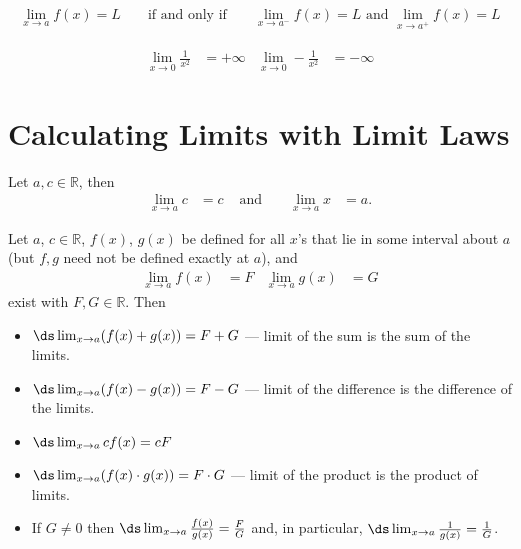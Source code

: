 \begin{theorem}
\begin{align*}
\lim_{x \to a} f(x) = L && \mbox{ if and only if } && \lim_{x \to a^-} f(x) = L \mbox{ and } \lim_{x \to a^+} f(x) = L
\end{align*}
\end{theorem}
\begin{align*}
\lim_{x \to 0} \frac{1}{x^2} &= +\infty & \lim_{x \to 0} -\frac{1}{x^2} &= -\infty
\end{align*}
\section{Calculating Limits with Limit Laws}
\begin{theorem}
Let $a, c\in\mathbb{R}$, then
\begin{align*}
\lim_{x \to a} c & = c & \text{ and }&& \lim_{x \to a} x &= a.
\end{align*}
\end{theorem}
\begin{theorem}
Let $a$, $c\in\mathbb{R}$, $f(x)$, $g(x)$ be defined for all $x$'s that lie in some interval about $a$ (but $f,g$ need not be defined exactly at $a$), and
\begin{align*}
\lim_{x \to a} f(x)&=F & \lim_{x \to a} g(x) &=G
\end{align*}
exist with $F,G \in \mathbb{R}$. Then
\begin{itemize}
\item $\ds \lim_{x \to a} (f(x) + g(x)) = F + G$ --- limit of the sum is the sum of the limits.
\item $\ds \lim_{x \to a} (f(x) - g(x)) = F - G$ --- limit of the difference is the difference of the limits.
\item $\ds \lim_{x \to a} c f(x) = c F$
\item $\ds \lim_{x \to a} ( f(x) \cdot g(x) ) = F \cdot G$ --- limit of the product is the product of limits.
\item If $G \neq 0$ then $\ds \lim_{x \to a} \frac{f(x)}{g(x)} = \frac{F}{G}$ and, in particular, $\ds \lim_{x\to a}\frac{1}{g(x)}=\frac{1}{G}$.
\end{itemize}
\end{theorem}

